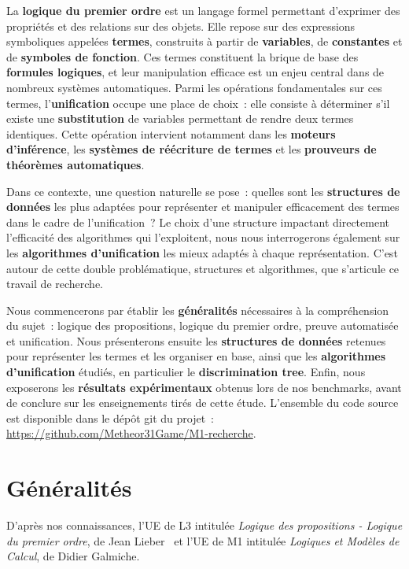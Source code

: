 \documentclass[11pt]{article}
\newenvironment{avantpropos}{%
    \begin{mdframed}[
        linecolor=sectioncolor!40,
        linewidth=0.8pt,
        backgroundcolor=sectioncolor!5,
        innerleftmargin=10pt,
        innerrightmargin=10pt,
        innertopmargin=6pt,
        innerbottommargin=6pt,
        skipabove=8pt,
        skipbelow=8pt
    ]
    \noindent\textbf{\small\color{sectioncolor}}\enspace\small\itshape
}{%
    \end{mdframed}
}
\begin{document}
\vspace{0.5cm}
La \textbf{logique du premier ordre} est un langage formel permettant d'exprimer 
des propriétés et des relations sur des objets. Elle repose sur des expressions 
symboliques appelées \textbf{termes}, construits à partir de \textbf{variables}, 
de \textbf{constantes} et de \textbf{symboles de fonction}. Ces termes constituent 
la brique de base des \textbf{formules logiques}, et leur manipulation efficace 
est un enjeu central dans de nombreux systèmes automatiques. Parmi les opérations 
fondamentales sur ces termes, l'\textbf{unification} occupe une place de choix~: 
elle consiste à déterminer s'il existe une \textbf{substitution} de variables 
permettant de rendre deux termes identiques. Cette opération intervient notamment 
dans les \textbf{moteurs d'inférence}, les \textbf{systèmes de réécriture de termes} 
et les \textbf{prouveurs de théorèmes automatiques}.

\vspace{0.5cm}
Dans ce contexte, une question naturelle se pose~: quelles sont les 
\textbf{structures de données} les plus adaptées pour représenter et manipuler 
efficacement des termes dans le cadre de l'unification~? Le choix d'une structure 
impactant directement l'efficacité des algorithmes qui l'exploitent, nous nous 
interrogerons également sur les \textbf{algorithmes d'unification} les mieux 
adaptés à chaque représentation. C'est autour de cette double problématique, 
structures et algorithmes, que s'articule ce travail de recherche.


\vspace{0.5cm}
Nous commencerons par établir les \textbf{généralités} nécessaires à la 
compréhension du sujet~: logique des propositions, logique du premier ordre, 
preuve automatisée et unification. Nous présenterons ensuite les 
\textbf{structures de données} retenues pour représenter les termes et les 
organiser en base, ainsi que les \textbf{algorithmes d'unification} étudiés, 
en particulier le \textbf{discrimination tree}. Enfin, nous exposerons les 
\textbf{résultats expérimentaux} obtenus lors de nos benchmarks, avant de 
conclure sur les enseignements tirés de cette étude. L'ensemble du code source 
est disponible dans le dépôt git du projet~: \url{https://github.com/Metheor31Game/M1-recherche}.

\newpage
\section{Généralités}
\begin{avantpropos}
    D'après nos connaissances, l'UE de L3 intitulée \emph{Logique des propositions - Logique du premier ordre}, de Jean Lieber~\cite{lieber2024cours} et l'UE de M1 intitulée \emph{Logiques et Modèles de Calcul}, de Didier Galmiche.
\end{avantpropos}
\end{document}
